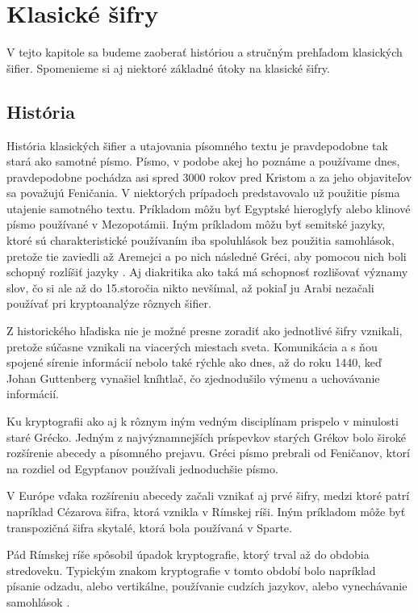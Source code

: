 \section{Klasické šifry}
V tejto kapitole sa budeme zaoberať históriou a stručným prehľadom klasických šifier.
Spomenieme si aj niektoré základné útoky na klasické šifry. 

\subsection{História}
História klasických šifier a utajovania písomného textu je pravdepodobne tak stará ako samotné písmo.
Písmo, v podobe akej ho poznáme a používame dnes, pravdepodobne pochádza asi spred 3000 rokov pred Kristom a za jeho objaviteľov sa považujú
Feničania.
V niektorých prípadoch predstavovalo už použitie písma utajenie samotného textu.
Príkladom môžu byť Egyptské hieroglyfy alebo klinové písmo používané v Mezopotámii.
Iným príkladom môžu byť semitské jazyky, ktoré sú charakteristické používaním iba spoluhlások bez použitia samohlások,
pretože tie zaviedli až Aremejci a po nich následné Gréci, aby pomocou nich boli schopný rozlíšiť jazyky \cite{ks}.
Aj diakritika ako taká má schopnosť rozlišovať významy slov, čo si ale až do 15.storočia nikto nevšímal,
až pokiaľ ju Arabi nezačali používať pri kryptoanalýze rôznych šifier.

Z historického hľadiska nie je možné presne zoradiť ako jednotlivé šifry vznikali, pretože súčasne vznikali na viacerých miestach sveta.
Komunikácia a s ňou spojené sírenie informácií nebolo také rýchle ako dnes, až do roku 1440, keď Johan Guttenberg vynašiel kníhtlač,
čo zjednodušilo výmenu a uchovávanie informácií.

Ku kryptografii ako aj k rôznym iným vedným disciplínam prispelo v minulosti staré Grécko.
Jedným z najvýznamnejších príspevkov starých Grékov bolo široké rozšírenie abecedy a písomného prejavu.
Gréci písmo prebrali od Feničanov, ktorí na rozdiel od Egypťanov používali jednoduchšie písmo.

V Európe vďaka rozšíreniu abecedy začali vznikať aj prvé šifry, medzi ktoré patrí napríklad Cézarova šifra, ktorá vznikla v Rímskej ríši.
Iným príkladom môže byť transpozičná šifra skytalé, ktorá bola používaná v Sparte.

Pád Rímskej ríše spôsobil úpadok kryptografie, ktorý trval až do obdobia stredoveku. Typickým znakom kryptografie v tomto období bolo
napríklad písanie odzadu, alebo vertikálne, používanie cudzích jazykov, alebo vynechávanie samohlások \cite{ks}.

